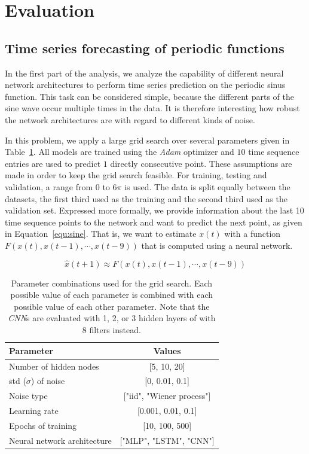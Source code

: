
\section{Evaluation}
\subsection{Time series forecasting of periodic functions}
\label{sec:sine}
In the first part of the analysis, we analyze the capability of different neural
network architectures to perform time series prediction on the periodic sinus
function. This task can be considered simple, because the different parts of the
sine wave occur multiple times in the data.
It is therefore interesting how
robust the network architectures are with regard to different kinds of noise.

In this problem, we apply a large grid search over several parameters given in
Table~\ref{tab:gridparameters}. All models are trained using the \emph{Adam}
optimizer and $10$ time sequence entries are used to predict $1$ directly
consecutive point. These assumptions are made in order to keep the grid search
feasible. For training, testing and validation, a range from $0$ to $6 \pi$ is
used. The data is split equally between the datasets, the first third used as 
the training and the second third used as the validation set.
Expressed more formally,
we provide information about the last 10 time sequence points
to the network and want to predict the next point, as given in
Equation~\ref{equ:sine}. That is, we want to estimate $x(t)$ with a function
$F(x(t), x(t-1), \cdots, x(t-9))$ that is computed using a neural network.

\begin{equation}
    \hat{x} (t + 1) \approx F(x(t), x(t-1), \cdots, x(t-9))
    \label{equ:sine}
\end{equation}


\begin{table}
    \centering
    \begin{tabular}{l|c}
        Parameter                   & Values                    \\
        \hline
        Number of hidden nodes      & [5, 10, 20]               \\
        std ($\sigma$) of noise     & [0, 0.01, 0.1]            \\
        Noise type                  & ["iid", "Wiener process"] \\
        Learning rate               & [0.001, 0.01, 0.1]        \\
        Epochs of training          & [10, 100, 500]            \\
        Neural network architecture & ["MLP", "LSTM", "CNN"]    \\
    \end{tabular}
    \caption{Parameter combinations used for the grid search. Each possible value
        of each parameter is combined with each possible value of each other
        parameter. Note that the \emph{CNN}s are evaluated with 1, 2, or 3 hidden
        layers of with 8 filters instead.}
    \label{tab:gridparameters}
\end{table}

